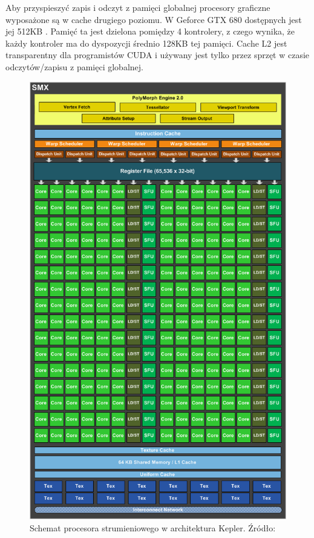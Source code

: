 Aby przyspieszyć zapis i odczyt z pamięci globalnej procesory graficzne
wyposażone są w cache drugiego poziomu. W Geforce GTX 680 dostępnych
jest jej 512KB . Pamięć ta jest dzielona pomiędzy 4 kontrolery, z czego wynika,
	 że każdy kontroler ma do dyspozycji średnio 128KB tej pamięci. Cache L2
	 jest transparentny dla programistów CUDA i używany jest tylko przez sprzęt
	 w czasie odczytów/zapisu z pamięci globalnej.

\begin{figure}[H]
\centering
\includegraphics[scale=0.4]{images/kepler-SMX-overview.png}
\caption{Schemat procesora strumieniowego w architektura Kepler. Źródło: \cite{gf680}}
\label{hier2}
\end{figure}

